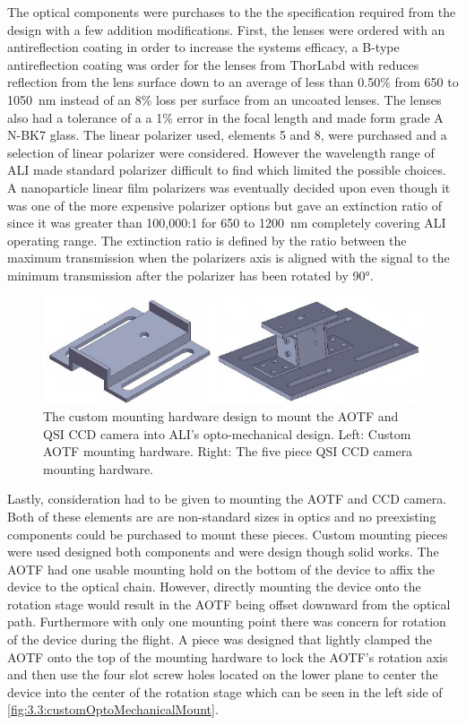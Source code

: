 The optical components were purchases to the the specification required from the design with a few addition modifications. First, the lenses were ordered with an antireflection coating in order to increase the systems efficacy, a B-type antireflection coating was order for the lenses from ThorLabd with reduces reflection from the lens surface down to an average of less than 0.50\% from 650 to 1050~nm instead of an 8\% loss per surface from an uncoated lenses. The lenses also had a tolerance of a a 1\% error in the focal length and made form grade A N-BK7 glass. The linear polarizer used, elements 5 and 8, were purchased and a selection of linear polarizer were considered. However the wavelength range of ALI made standard polarizer difficult to find which limited the possible choices. A nanoparticle linear film polarizers was eventually decided upon even though it was one of the more expensive polarizer options but gave an extinction ratio of since it was greater than 100,000:1 for 650 to 1200~nm completely covering ALI operating range. The extinction ratio is defined by the ratio between the maximum transmission when the polarizers axis is aligned with the signal to the minimum transmission after the polarizer has been rotated by 90\si{\degree}.

\begin{figure}[h!]
        \includegraphics[width=1.0\textwidth]{./Images/3-3-CustomMountingPieces.pdf}
        \caption[ALI Custom Mounting Hardware]{The custom mounting hardware design to mount the AOTF and QSI CCD camera into ALI's opto-mechanical design. Left: Custom AOTF mounting hardware. Right: The five piece QSI CCD camera mounting hardware.}
        \label{fig:3.3:customOptoMechanicalMount}
\end{figure}

Lastly, consideration had to be given to mounting the AOTF and CCD camera. Both of these elements are are non-standard sizes in optics and no preexisting components could be purchased to mount these pieces. Custom mounting pieces were used designed both components and were design though solid works. The AOTF had one usable mounting hold on the bottom of the device to affix the device to the optical chain. However, directly mounting the device onto the rotation stage would result in the AOTF being offset downward from the optical path. Furthermore with only one mounting point there was concern for rotation of the device during the flight. A piece was designed that lightly clamped the AOTF onto the top of the mounting hardware to lock the AOTF's rotation axis and then use the four slot screw holes located on the lower plane to center the device into the center of the rotation stage which can be seen in the left side of \autoref{fig:3.3:customOptoMechanicalMount}.

